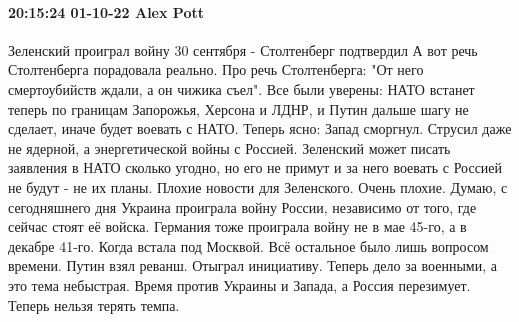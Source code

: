 \paragraph{20:15:24 01-10-22 Alex Pott}

Зеленский проиграл войну 30 сентября - Столтенберг подтвердил
А вот речь Столтенберга порадовала реально.
Про речь Столтенберга: "От него смертоубийств ждали, а он чижика съел".
Все были уверены: НАТО встанет теперь по границам Запорожья, Херсона и ЛДНР, и Путин дальше шагу не сделает, иначе будет воевать с НАТО.
Теперь ясно: Запад сморгнул. Струсил даже не ядерной, а энергетической войны с Россией. Зеленский может писать заявления в НАТО сколько угодно, но его не примут и за него воевать с Россией не будут - не их планы.
Плохие новости для Зеленского. Очень плохие. Думаю, с сегодняшнего дня Украина проиграла войну России, независимо от того, где сейчас стоят её войска. Германия тоже проиграла войну не в мае 45-го, а в декабре 41-го. Когда встала под Москвой. Всё остальное было лишь вопросом времени.
Путин взял реванш. Отыграл инициативу. Теперь дело за военными, а это тема небыстрая. Время против Украины и Запада, а Россия перезимует. Теперь нельзя терять темпа.

